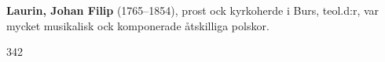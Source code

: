 \textbf{Laurin, Johan Filip} (1765--1854), prost ock kyrkoherde i Burs, teol.\@ d:r, var mycket musikalisk ock komponerade åtskilliga polskor. 

342 
